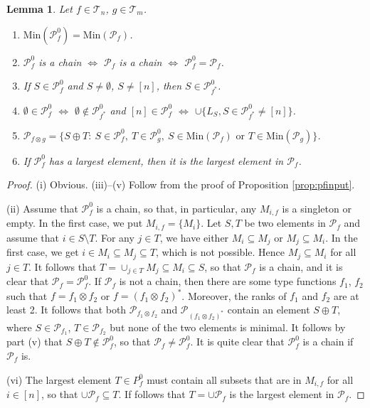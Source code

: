 \documentclass[12pt]{article}
\newtheorem{lemma}{Lemma}
\theoremstyle{definition}
\theoremstyle{remark}
\def\Te{\mathcal T}
\def\Pe{\mathcal P}
\begin{document}
\begin{lemma}\label{lemma:p0_constr} Let $f\in \Te_{n}$, $g\in \Te_{m}$. 
\begin{enumerate}
\item[(i)] $\mathrm{Min}(\Pe_f^0)=\mathrm{Min}(\Pe_f)$.
\item[(ii)] $\Pe_f^0$ is a chain $\iff$  $\Pe_f$ is a chain $\iff$  $\Pe_f^0=\Pe_f$. 
\item[(iii)] If $S\in \Pe_f^0$ and $S\ne \emptyset$, $S\ne [n]$, then $S\in \Pe^0_{f^*}$. 
\item[(iv)] $\emptyset \in \Pe^0_f$ $\iff$ $\emptyset \notin \Pe^0_{f^*}$ and  $[n]\in \Pe^0_f$ $\iff$ $\cup \{L_S, S\in \Pe^0_{f^*}\ne [n]\}$.
\item[(v)] $\Pe_{f\otimes g}=\{S\oplus T:\ S\in \Pe_f^0,\ T\in \Pe_g^0, \ S\in
\mathrm{Min}(\Pe_f) \text{ or } T\in \mathrm{Min}(\Pe_g)\}$.

\item[(vi)] If $\Pe^0_f$ has a largest element, then it is the largest element in $\Pe_f$. 

\end{enumerate}


\end{lemma}


\begin{proof} (i) Obvious. (iii)--(v) Follow from the proof of Proposition \ref{prop:pfinput}. 

(ii) Assume that $\Pe^0_f$ is a chain, so that, in particular,
any $M_{i,f}$ is a singleton or empty. In the first case, we put $M_{i,f}=\{M_i\}$. Let $S,T$ be two
elements in $\Pe_f$ and assume that $i\in S\setminus T$. For any $j\in T$, we have either
$M_i\subseteq M_j$ or $M_j\subseteq M_i$. In the first case, we get $i\in M_i\subseteq
M_j\subseteq T$, which is not possible. Hence $M_j\subseteq M_i$ for all $j\in T$. It
follows that $T=\cup_{j\in T} M_j\subseteq M_i\subseteq S$, so that $\Pe_f$ is a chain,
and it is clear that $\Pe_f=\Pe_f^0$. If $\Pe_f$ is not a chain, then there are some type
functions
$f_1$, $f_2$ such that $f=f_1\otimes f_2$ or $f=(f_1\otimes f_2)^*$. Moreover, the ranks
of $f_1$ and $f_2$ are at least 2. It follows that both $\Pe_{f_1\otimes f_2}$ and
$\Pe_{(f_1\otimes f_2)^*}$ contain an element $S\oplus T$, where $S\in \Pe_{f_1}$, $T\in
\Pe_{f_2}$ but none of the two elements is minimal. It follows by part (v) that $S\oplus T\notin
\Pe_f^0$, so that $\Pe_f\ne \Pe_f^0$. It is quite clear that $\Pe_f^0$ is a chain if
$\Pe_f$ is.

(vi) The largest element  $T\in P^0_f$ must contain all subsets that are in $M_{i,f}$ for all
$i\in [n]$, so that  $\cup \Pe_f\subseteq T$. If follows that $T=\cup\Pe_f $ is the largest
element in $\Pe_f$. 




\end{proof}
\end{document}
